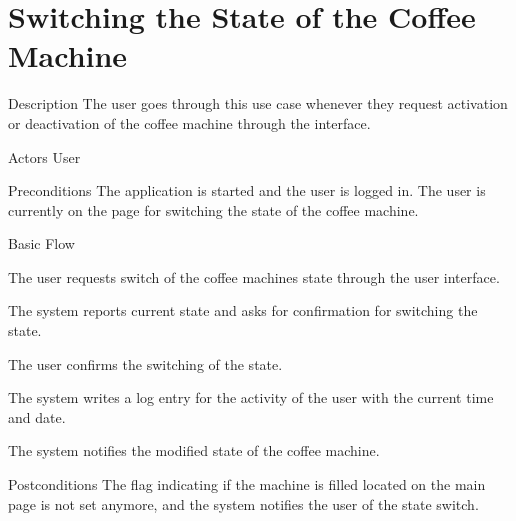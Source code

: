 \section{Switching the State of the Coffee Machine}

\begin{cpart}{Description}
The user goes through this use case whenever they request activation or deactivation of the coffee machine through the interface.
\end{cpart}

\begin{cpart}{Actors}
User
\end{cpart}

\begin{cpart}{Preconditions}
The application is started and the user is logged in. The user is currently on the page for switching the state of the coffee machine.
\end{cpart}

\begin{cpartList}{Basic Flow}
  \item The user requests switch of the coffee machines state through the user interface.
  \item The system reports current state and asks for confirmation for switching the state.
  \item The user confirms the switching of the state.
  \item The system writes a log entry for the activity of the user with the current time and date.
  \item The system notifies the modified state of the coffee machine.
\end{cpartList}

\begin{cpart}{Postconditions}
The flag indicating if the machine is filled located on the main page is not set anymore, and the system notifies the user of the state switch.
\end{cpart}

\clearpage
